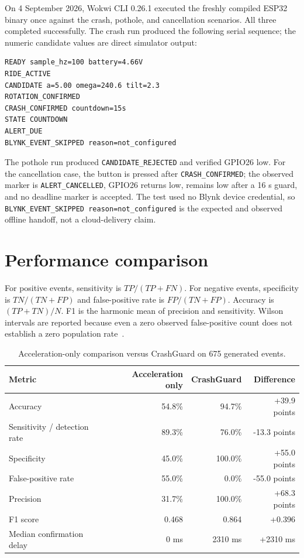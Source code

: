 \documentclass[12pt,a4paper]{article}
\begin{document}
On 4 September 2026, Wokwi CLI 0.26.1 executed the freshly compiled ESP32
binary once against the crash, pothole, and cancellation scenarios. All three
completed successfully. The crash run produced the following serial sequence;
the numeric candidate values are direct simulator output:

\begin{lstlisting}
READY sample_hz=100 battery=4.66V
RIDE_ACTIVE
CANDIDATE a=5.00 omega=240.6 tilt=2.3
ROTATION_CONFIRMED
CRASH_CONFIRMED countdown=15s
STATE COUNTDOWN
ALERT_DUE
BLYNK_EVENT_SKIPPED reason=not_configured
\end{lstlisting}

The pothole run produced \texttt{CANDIDATE\_REJECTED} and verified GPIO26 low.
For the cancellation case, the button is pressed after
\texttt{CRASH\_CONFIRMED}; the observed marker is
\texttt{ALERT\_CANCELLED}, GPIO26 returns low, remains low after a 16 s guard,
and no deadline marker is accepted. The test used no Blynk device credential,
so \texttt{BLYNK\_EVENT\_SKIPPED reason=not\_configured} is the expected and
observed offline handoff, not a cloud-delivery claim.

\section{Performance comparison}
\label{sec:performance}

For positive events, sensitivity is $TP/(TP+FN)$. For negative events,
specificity is $TN/(TN+FP)$ and false-positive rate is $FP/(TN+FP)$.
Accuracy is $(TP+TN)/N$. F1 is the harmonic mean of precision and sensitivity.
Wilson intervals are reported because even a zero observed false-positive
count does not establish a zero population rate~\cite{wilson1927interval}.

\begin{table}[H]
\centering
\small
\caption{Acceleration-only comparison versus CrashGuard on 675 generated events.}
\label{tab:performance}
\begin{tabular}{@{}lrrr@{}}
\toprule
Metric & Acceleration only & CrashGuard & Difference \\
\midrule
Accuracy & 54.8\% & 94.7\% & +39.9 points \\
Sensitivity / detection rate & 89.3\% & 76.0\% & -13.3 points \\
Specificity & 45.0\% & 100.0\% & +55.0 points \\
False-positive rate & 55.0\% & 0.0\% & -55.0 points \\
Precision & 31.7\% & 100.0\% & +68.3 points \\
F1 score & 0.468 & 0.864 & +0.396 \\
Median confirmation delay & 0 ms & 2310 ms & +2310 ms \\
\bottomrule
\end{tabular}
\end{table}
\end{document}
